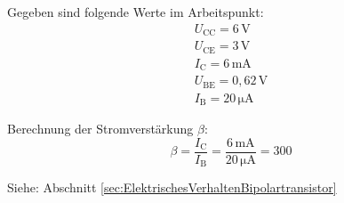 {\begin{figure}[H]
\begin{subfigure}[b]{0.45\textwidth}
        \end{subfigure}\label{fig:LsgTransistorStromverstaerkung2}
    \end{figure}
    Gegeben sind folgende Werte im Arbeitspunkt:
    \begin{gather*}
        U_\mathrm{CC} = \mathrm{6\,V}      \\
        U_\mathrm{CE} = \mathrm{3\,V}      \\
        I_\mathrm{C} = \mathrm{6\,mA}      \\
        U_\mathrm{BE} = \mathrm{0{,}62\,V} \\
        I_\mathrm{B} = \mathrm{20\,\mu A}
    \end{gather*}

    Berechnung der Stromverstärkung \( \beta \):
    \begin{equation*}
        \beta = \frac{I_\mathrm{C}}{I_\mathrm{B}} = \frac{\mathrm{6\,mA}}{\mathrm{20\,\mu A}} = \mathrm{300}
    \end{equation*}

    Siehe: Abschnitt \ref{sec:ElektrischesVerhaltenBipolartransistor}
}